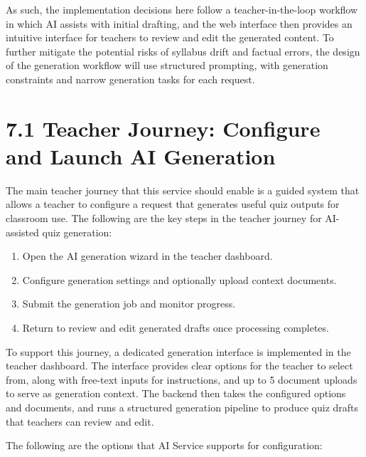 \documentclass[
  12pt,
  a4paper,
]{report}
\begin{document}
As such, the implementation decisions here follow a teacher-in-the-loop
workflow in which AI assists with initial drafting, and the web
interface then provides an intuitive interface for teachers to review
and edit the generated content. To further mitigate the potential risks
of syllabus drift and factual errors, the design of the generation
workflow will use structured prompting, with generation constraints and
narrow generation tasks for each request.

\hypertarget{user-workflow-and-interface-design}{%
\section{7.1 Teacher Journey: Configure and Launch AI
Generation}\label{user-workflow-and-interface-design}}

The main teacher journey that this service should enable is a guided
system that allows a teacher to configure a request that generates
useful quiz outputs for classroom use. The following are the key
steps in the teacher journey for AI-assisted quiz generation:

\begin{enumerate}
  \item Open the AI generation wizard in the teacher dashboard.
  \item Configure generation settings and optionally upload context documents.
  \item Submit the generation job and monitor progress.
  \item Return to review and edit generated drafts once processing completes.
\end{enumerate}

To support this journey, a dedicated generation interface is implemented in
the teacher dashboard. The interface provides clear options for the
teacher to select from, along with free-text inputs for instructions, and
up to 5 document uploads to serve as generation context. The backend then
takes the configured options and documents, and runs a structured generation
pipeline to produce quiz drafts that teachers can review and edit.

The following are the options that AI Service supports for configuration:
\end{document}
